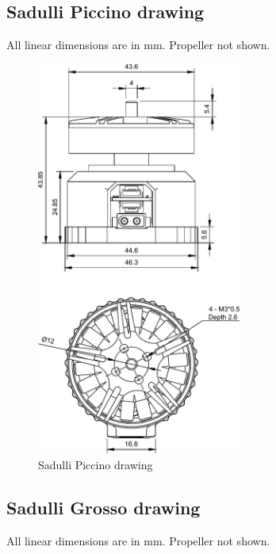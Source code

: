\documentclass{document_templates/documentation_template_latex/zubaxdoc}
\begin{document}
\newpage

\subsection{Sadulli Piccino drawing}
All linear dimensions are in mm. Propeller not shown.

\begin{figure}[!hbt]
	\centerline{\includegraphics[width=0.6\textwidth]{figures/sadulli_piccino}}
	\caption{Sadulli Piccino drawing\label{Piccino_drawing}}
\end{figure}

\newpage

\subsection{Sadulli Grosso drawing}
All linear dimensions are in mm. Propeller not shown.
\end{document}
